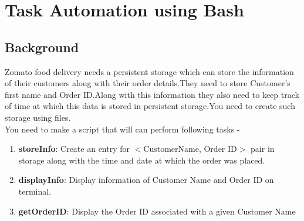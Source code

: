 \documentclass[12pt]{article}
\begin{document}
\section{Task Automation using Bash}
\vspace{0.5 em}
\subsection{Background}
\vspace{1 em}
Zomato food delivery needs a persistent storage which can store the information of their customers along with their order details.They need to store Customer's first name and Order ID.Along with this information they also need to keep track of time at which this data is stored in persistent storage.You need to create such storage using files. \\
You need to make a script that will can perform following tasks - 
\begin{enumerate}
    \item  \textbf{storeInfo}: Create an entry for $<$CustomerName, Order ID$>$ pair in storage along with the time and date at which the order was placed.
    \item \textbf{displayInfo}: Display information of Customer Name and Order ID on terminal.
    \item \textbf{getOrderID}: Display the Order ID associated with a given Customer Name
\end{enumerate}
\end{document}
